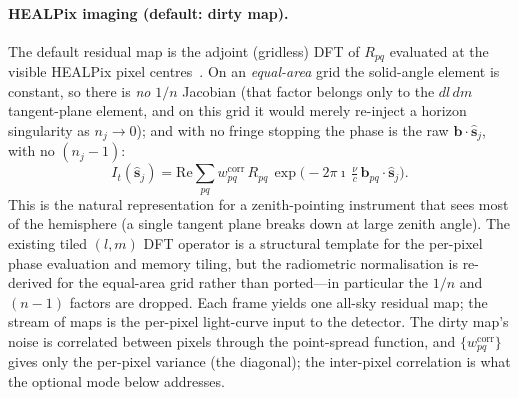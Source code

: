 \documentclass[11pt]{article}
\begin{document}
\paragraph{HEALPix imaging (default: dirty map).} The default residual map is the adjoint
(gridless) DFT of $R_{pq}$ evaluated at the visible HEALPix pixel centres~\cite{healpix}. On an
\emph{equal-area} grid the solid-angle element is constant, so there is \emph{no} $1/n$ Jacobian
(that factor belongs only to the $dl\,dm$ tangent-plane element, and on this grid it would merely
re-inject a horizon singularity as $n_j\to0$); and with no fringe stopping the phase is the raw
$\bm{b}\cdot\hat{\bm{s}}_j$, with no $(n_j-1)$:
\begin{equation}
  I_t(\hat{\bm{s}}_j)=\mathrm{Re}\!\sum_{pq}
  w^{\mathrm{corr}}_{pq}\,R_{pq}\,
  \exp\!\Big(\!-2\pi\imath\,\tfrac{\nu}{c}\,\bm{b}_{pq}\cdot\hat{\bm{s}}_j\Big).
\end{equation}
This is the natural representation for a zenith-pointing instrument that sees most of the hemisphere
(a single tangent plane breaks down at large zenith angle). The existing tiled $(l,m)$ DFT operator
is a structural template for the per-pixel phase evaluation and memory tiling, but the radiometric
normalisation is re-derived for the equal-area grid rather than ported---in particular the $1/n$ and
$(n-1)$ factors are dropped. Each frame yields one all-sky residual map; the stream of maps is the
per-pixel light-curve input to the detector. The dirty map's noise is correlated between pixels
through the point-spread function, and $\{w^{\mathrm{corr}}_{pq}\}$ gives only the per-pixel
variance (the diagonal); the inter-pixel correlation is what the optional mode below addresses.
\end{document}
